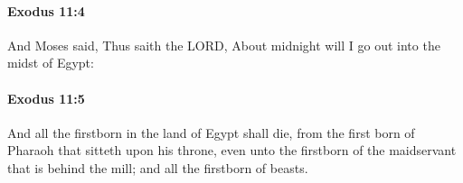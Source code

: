 		\paragraph{Exodus 11:4} %
			\label{EXODUS-11-4}

			And Moses said, Thus saith the LORD, About midnight will I go out into the midst of Egypt:


		\paragraph{Exodus 11:5} %
			\label{EXODUS-11-5}

			And all the firstborn in the land of Egypt shall die, from the first born of Pharaoh that sitteth upon his throne, even unto the firstborn of the maidservant that is behind the mill; and all the firstborn of beasts.



